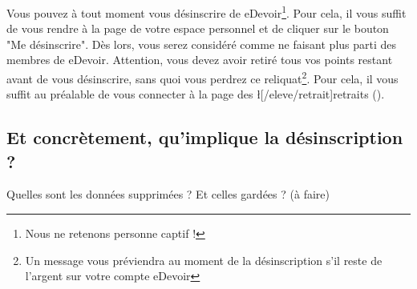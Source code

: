 ﻿Vous pouvez à tout moment vous désinscrire de eDevoir\footnote{Nous ne retenons personne captif !}. Pour cela, il vous suffit de vous rendre à la page  de votre espace personnel et de cliquer sur le bouton "Me désinscrire". Dès lors, vous serez considéré comme ne faisant plus parti des membres de eDevoir. Attention, vous devez avoir retiré tous vos points restant avant de vous désinscrire, sans quoi vous perdrez ce reliquat\footnote{Un message vous préviendra au moment de la désinscription s'il reste de l'argent sur votre compte eDevoir}. Pour cela, il vous suffit au préalable de vous connecter à la page des \l[/eleve/retrait]{retraits} ().

\subsection{Et concrètement, qu'implique la désinscription ?}
Quelles sont les données supprimées ? Et celles gardées ? (à faire)